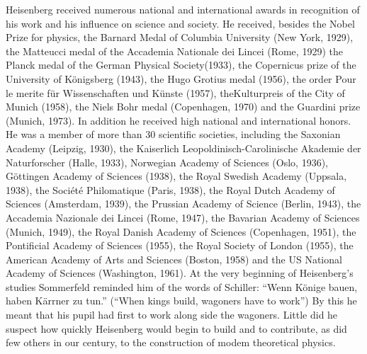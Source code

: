 \documentclass{article}
\begin{document}
Heisenberg received numerous national and international awards in recognition of his work and his influence on science and society. He received, besides the Nobel Prize for physics, the Barnard Medal of Columbia University (New York, 1929), the Matteucci medal of the Accademia Nationale dei Lincei (Rome, 1929) the Planck medal of the German Physical Society(1933), the Copernicus prize of the University of Königsberg (1943), the Hugo Grotius medal (1956), the order Pour le merite für Wissenschaften und Künste (1957), theKulturpreis of the City of Munich (1958), the Niels Bohr medal (Copenhagen, 1970) and the Guardini prize (Munich, 1973). In addition he received high national and international honors. He was a member of more than 30 scientific societies, including the Saxonian Academy (Leipzig, 1930), the Kaiserlich Leopoldinisch-Carolinische Akademie der Naturforscher (Halle, 1933), Norwegian Academy of Sciences (Oslo, 1936), Göttingen Academy of Sciences (1938), the Royal Swedish Academy (Uppsala, 1938), the Société Philomatique (Paris, 1938), the Royal Dutch Academy of Sciences (Amsterdam, 1939), the Prussian Academy of Science (Berlin, 1943), the Accademia Nazionale dei Lincei (Rome, 1947), the Bavarian Academy of Sciences (Munich, 1949), the Royal Danish Academy of Sciences (Copenhagen, 1951), the Pontificial Academy of Sciences (1955), the Royal Society of London (1955), the American Academy of Arts and Sciences (Boston, 1958) and the US National Academy of Sciences (Washington, 1961). At the very beginning of Heisenberg's studies Sommerfeld reminded him of the words of Schiller: ``Wenn Könige bauen, haben Kärrner zu tun.'' (“When kings build, wagoners have to work”) By this he meant that his pupil had first to work along side the wagoners. Little did he suspect how quickly Heisenberg would begin to build and to contribute, as did few others in our century, to the construction of modem theoretical physics.
\end{document}
